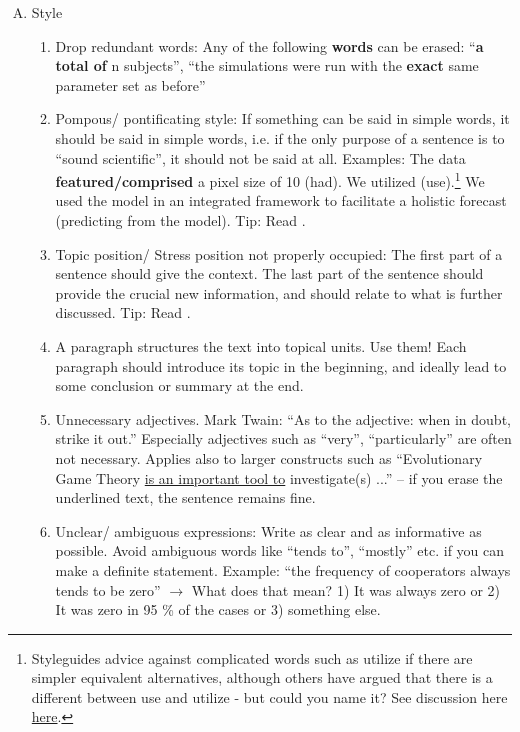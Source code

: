 \documentclass{tufte-book}
\begin{document}
\begin{enumerate}[(A)]
\item Style
\begin{enumerate}
	\item Drop redundant words: Any of the following \textbf{words} can be erased: ``\textbf{a total of} n subjects'', ``the simulations were run with the \textbf{exact} same parameter set as before''
	\item Pompous/ pontificating style: If something can be said in simple words, it should be said in simple words, i.e. if the only purpose of a sentence is to ``sound scientific'', it should not be said at all. Examples: The data \textbf{featured/comprised} a pixel size of 10 (had). We utilized (use).\footnote{Styleguides advice against complicated words such as utilize if there are simpler equivalent alternatives, although others have argued that there is a different between use and utilize - but could you name it? See discussion here \href{http://en.wiktionary.org/wiki/utilise}{here}.} We used the model in an integrated framework to facilitate a holistic forecast (predicting from the model). Tip: Read \citet{Woodford-Sounderthinkingthrough-1967}.
	\item Topic position/ Stress position not properly occupied: The first part of a sentence should give the context. The last part of the sentence should provide the crucial new information, and should relate to what is further discussed. Tip: Read \citet{Gopen-ScienceOfScientific-1990}.
	\item A paragraph structures the text into topical units. Use them! Each paragraph should introduce its topic in the beginning, and ideally lead to some conclusion or summary at the end. 
	\item Unnecessary adjectives. Mark Twain: ``As to the adjective: when in doubt, strike it out.'' Especially adjectives such as ``very'', ``particularly'' are often not necessary. Applies also to larger constructs such as ``Evolutionary Game Theory \uline{is an important tool to} investigate(s) ...'' -- if you erase the underlined text, the sentence remains fine.
	\item Unclear/ ambiguous expressions: Write as clear and as informative as possible. Avoid ambiguous words like ``tends to'', ``mostly'' etc. if you can make a definite statement. Example: ``the frequency of cooperators always tends to be zero''  $\rightarrow$ What does that mean? 1) It was always zero or 2) It was zero in 95 \% of the cases or 3) something else.
\end{enumerate}


\end{enumerate}
\end{document}
